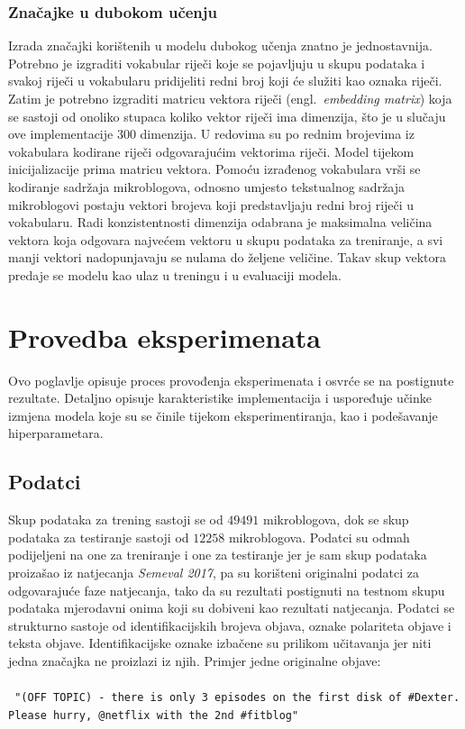 \documentclass[times, utf8, zavrsni]{fer}
\begin{document}
\subsection{Značajke u dubokom učenju}

Izrada značajki korištenih u modelu dubokog učenja znatno je jednostavnija. Potrebno je izgraditi vokabular riječi koje se pojavljuju u skupu podataka i svakoj riječi u vokabularu pridijeliti redni broj koji će služiti kao oznaka riječi. Zatim je potrebno izgraditi matricu vektora riječi (engl.~\emph{embedding matrix}) koja se sastoji od onoliko stupaca koliko vektor riječi ima dimenzija, što je u slučaju ove implementacije 300 dimenzija. U redovima su po rednim brojevima iz vokabulara kodirane riječi odgovarajućim vektorima riječi. Model tijekom inicijalizacije prima matricu vektora. Pomoću izrađenog vokabulara vrši se kodiranje sadržaja mikroblogova, odnosno umjesto tekstualnog sadržaja mikroblogovi postaju vektori brojeva koji predstavljaju redni broj riječi u vokabularu. Radi konzistentnosti dimenzija odabrana je maksimalna veličina vektora koja odgovara najvećem vektoru u skupu podataka za treniranje, a svi manji vektori nadopunjavaju se nulama do željene veličine. Takav skup vektora predaje se modelu kao ulaz u treningu i u evaluaciji modela.

\chapter{Provedba eksperimenata}

Ovo poglavlje opisuje proces provođenja eksperimenata i osvrće se na postignute rezultate. Detaljno opisuje karakteristike implementacija i uspoređuje učinke izmjena modela koje su se činile tijekom eksperimentiranja, kao i podešavanje hiperparametara.

\section{Podatci}

Skup podataka za trening sastoji se od $49491$ mikroblogova, dok se skup podataka za testiranje sastoji od $12258$ mikroblogova. Podatci su odmah podijeljeni na one za treniranje i one za testiranje jer je sam skup podataka proizašao iz natjecanja \emph{Semeval 2017}, pa su korišteni originalni podatci za odgovarajuće faze natjecanja, tako da su rezultati postignuti na testnom skupu podataka mjerodavni onima koji su dobiveni kao rezultati natjecanja. Podatci se strukturno sastoje od identifikacijskih brojeva objava, oznake polariteta objave i teksta objave. Identifikacijske oznake izbačene su prilikom učitavanja jer niti jedna značajka ne proizlazi iz njih. 
Primjer jedne originalne objave:\\\\
\texttt{
\footnotesize{"(OFF TOPIC) - there is only 3 episodes on the first disk of \#Dexter. Please hurry, @netflix with the 2nd \#fitblog" }
}\\
\end{document}
